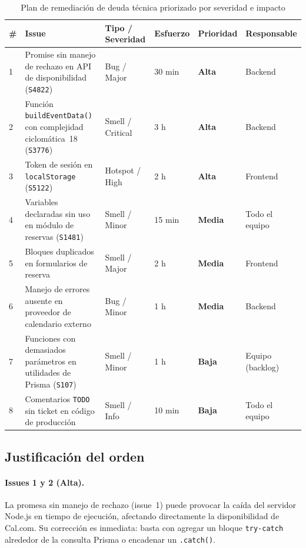 \documentclass[12pt,letterpaper]{article}
\begin{document}
\begin{table}[H]
\centering
\caption{Plan de remediación de deuda técnica priorizado por severidad e impacto}
\label{tab:remediation}
\small
\begin{tabularx}{\textwidth}{|p{0.4cm}|X|p{1.6cm}|p{1.7cm}|p{1.4cm}|p{1.5cm}|}
\hline
\textbf{\#} & \textbf{Issue} & \textbf{Tipo / Severidad} &
\textbf{Esfuerzo} & \textbf{Prioridad} & \textbf{Responsable} \\
\hline
1 & Promise sin manejo de rechazo en API de disponibilidad (\texttt{S4822})
  & Bug / Major & 30 min & \textbf{Alta} & Backend \\
\hline
2 & Función \texttt{buildEventData()} con complejidad ciclomática~18 (\texttt{S3776})
  & Smell / Critical & 3 h & \textbf{Alta} & Backend \\
\hline
3 & Token de sesión en \texttt{localStorage} (\texttt{S5122})
  & Hotspot / High & 2 h & \textbf{Alta} & Frontend \\
\hline
4 & Variables declaradas sin uso en módulo de reservas (\texttt{S1481})
  & Smell / Minor & 15 min & \textbf{Media} & Todo el equipo \\
\hline
5 & Bloques duplicados en formularios de reserva
  & Smell / Major & 2 h & \textbf{Media} & Frontend \\
\hline
6 & Manejo de errores ausente en proveedor de calendario externo
  & Bug / Minor & 1 h & \textbf{Media} & Backend \\
\hline
7 & Funciones con demasiados parámetros en utilidades de Prisma (\texttt{S107})
  & Smell / Minor & 1 h & \textbf{Baja} & Equipo (backlog) \\
\hline
8 & Comentarios \texttt{TODO} sin ticket en código de producción
  & Smell / Info & 10 min & \textbf{Baja} & Todo el equipo \\
\hline
\end{tabularx}
\end{table}

\subsection{Justificación del orden}

\paragraph{Issues 1 y 2 (Alta).}
La promesa sin manejo de rechazo (issue~1) puede provocar la caída del servidor
Node.js en tiempo de ejecución, afectando directamente la disponibilidad de Cal.com.
Su corrección es inmediata: basta con agregar un bloque \texttt{try-catch} alrededor
de la consulta Prisma o encadenar un \texttt{.catch()}.
\end{document}
